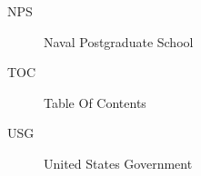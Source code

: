 \begin{description}
   \item[NPS] Naval Postgraduate School
   \item[TOC] Table Of Contents
   \item[USG] United States Government
\end{description}







